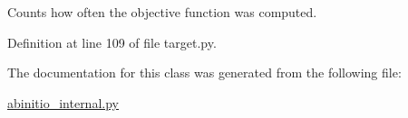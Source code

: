 \-Counts how often the objective function was computed. 



\-Definition at line 109 of file target.\-py.



\-The documentation for this class was generated from the following file\-:\begin{DoxyCompactItemize}
\item 
\hyperlink{abinitio__internal_8py}{abinitio\-\_\-internal.\-py}\end{DoxyCompactItemize}
